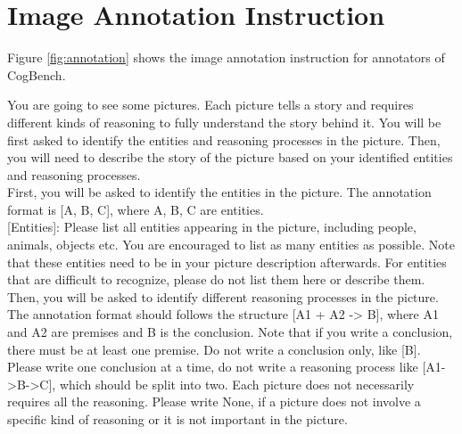 \section{Image Annotation Instruction}
\label{sec:annotation_instruction}

Figure \ref{fig:annotation} shows the image annotation instruction for annotators of CogBench.

\begin{figure*}
    \begin{tcolorbox}[
      colframe = blue!30!white, 
      colback = blue!2!white,
      colbacktitle = blue!10!white,
      colupper = black, collower = yellow!75!red,
      coltitle = black!90!white
      ]
      \small
      You are going to see some pictures. Each picture tells a story and requires different kinds of reasoning to fully understand the story behind it. You will be first asked to identify the entities and reasoning processes in the picture. Then, you will need to describe the story of the picture based on your identified entities and reasoning processes. \\
  
      First, you will be asked to identify the entities in the picture. The annotation format is [A, B, C], where A, B, C are entities. \\
  
      [Entities]: Please list all entities appearing in the picture, including people, animals, objects etc. You are encouraged to list as many entities as possible. Note that these entities need to be in your picture description afterwards. For entities that are difficult to recognize, please do not list them here or describe them. \\
  
      Then, you will be asked to identify different reasoning processes in the picture. The annotation format should follows the structure [A1 + A2 -> B], where A1 and A2 are premises and B is the conclusion. Note that if you write a conclusion, there must be at least one premise. Do not write a conclusion only, like [B]. Please write one conclusion at a time, do not write a reasoning process like [A1->B->C], which should be split into two. Each picture does not necessarily requires all the reasoning. Please write None, if a picture does not involve a specific kind of reasoning or it is not important in the picture. \\
  

\end{tcolorbox}
\end{figure*}
